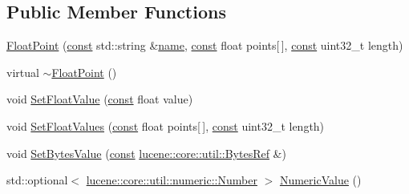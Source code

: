 \subsection*{Public Member Functions}
\begin{DoxyCompactItemize}
\item 
\mbox{\hyperlink{classlucene_1_1core_1_1document_1_1FloatPoint_a5ea967634ff73cdde9915e722bc823fc}{Float\+Point}} (\mbox{\hyperlink{ZlibCrc32_8h_a2c212835823e3c54a8ab6d95c652660e}{const}} std\+::string \&\mbox{\hyperlink{classlucene_1_1core_1_1document_1_1Field_a52f673f3b3abb14b180f5159f4726537}{name}}, \mbox{\hyperlink{ZlibCrc32_8h_a2c212835823e3c54a8ab6d95c652660e}{const}} float points\mbox{[}$\,$\mbox{]}, \mbox{\hyperlink{ZlibCrc32_8h_a2c212835823e3c54a8ab6d95c652660e}{const}} uint32\+\_\+t length)
\item 
virtual \mbox{\hyperlink{classlucene_1_1core_1_1document_1_1FloatPoint_af7445c4ea46294911dce52ae13d4b62a}{$\sim$\+Float\+Point}} ()
\item 
void \mbox{\hyperlink{classlucene_1_1core_1_1document_1_1FloatPoint_a4e1f81bce5f905e267a32c4882faf90e}{Set\+Float\+Value}} (\mbox{\hyperlink{ZlibCrc32_8h_a2c212835823e3c54a8ab6d95c652660e}{const}} float value)
\item 
void \mbox{\hyperlink{classlucene_1_1core_1_1document_1_1FloatPoint_a37fb83ede21d310e7bda0cbd072650b4}{Set\+Float\+Values}} (\mbox{\hyperlink{ZlibCrc32_8h_a2c212835823e3c54a8ab6d95c652660e}{const}} float points\mbox{[}$\,$\mbox{]}, \mbox{\hyperlink{ZlibCrc32_8h_a2c212835823e3c54a8ab6d95c652660e}{const}} uint32\+\_\+t length)
\item 
void \mbox{\hyperlink{classlucene_1_1core_1_1document_1_1FloatPoint_a8862567e2ebfd0b8192eaec0967a943a}{Set\+Bytes\+Value}} (\mbox{\hyperlink{ZlibCrc32_8h_a2c212835823e3c54a8ab6d95c652660e}{const}} \mbox{\hyperlink{classlucene_1_1core_1_1util_1_1BytesRef}{lucene\+::core\+::util\+::\+Bytes\+Ref}} \&)
\item 
std\+::optional$<$ \mbox{\hyperlink{classlucene_1_1core_1_1util_1_1numeric_1_1Number}{lucene\+::core\+::util\+::numeric\+::\+Number}} $>$ \mbox{\hyperlink{classlucene_1_1core_1_1document_1_1FloatPoint_ac2f070785fcce64c8214bb851fb6087c}{Numeric\+Value}} ()
\end{DoxyCompactItemize}
